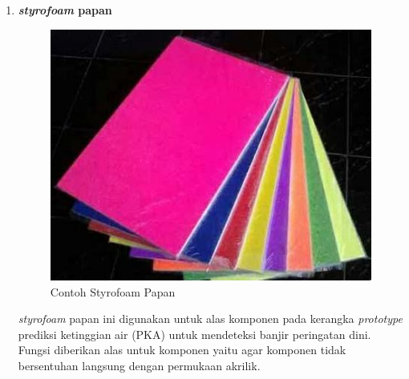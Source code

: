 \begin{enumerate}
\item \textbf{\textit{styrofoam} papan}
\begin{figure}[H]
\centering
\includegraphics[width=1\textwidth]{figures/sterofoam.png}
\caption{Contoh Styrofoam Papan}
\label{print}
\end{figure}

\par \textit{styrofoam} papan ini digunakan untuk alas komponen pada kerangka \textit{prototype} prediksi ketinggian air (PKA) untuk mendeteksi banjir peringatan dini. Fungsi diberikan alas untuk komponen yaitu agar komponen tidak bersentuhan langsung dengan permukaan akrilik.

\end{enumerate}

